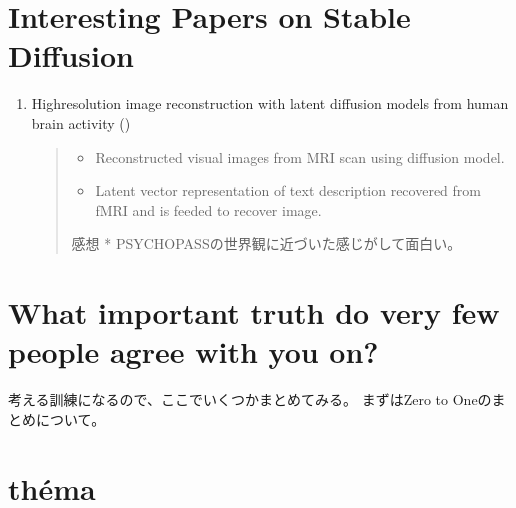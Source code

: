 \documentclass[letterpaper,10pt,english]{sphinxmanual}
\begin{document}
\sphinxstepscope


\section{Interesting Papers on Stable Diffusion}
\label{\detokenize{src/theme/stablediffusion_papers:interesting-papers-on-stable-diffusion}}\label{\detokenize{src/theme/stablediffusion_papers::doc}}\begin{enumerate}
%
\item {} 
\sphinxAtStartPar
High\sphinxhyphen{}resolution image reconstruction with latent diffusion models from human brain activity ()
\begin{quote}
\begin{itemize}
\item {} 
\sphinxAtStartPar
Reconstructed visual images from MRI scan using diffusion model.

\item {} 
\sphinxAtStartPar
Latent vector representation of text description recovered from fMRI and is feeded to recover image.

\end{itemize}

\sphinxAtStartPar
感想
* PSYCHO\sphinxhyphen{}PASSの世界観に近づいた感じがして面白い。
\end{quote}

\end{enumerate}

\sphinxstepscope


\section{What important truth do very few people agree with you on?}
\label{\detokenize{src/theme/zerotoone:what-important-truth-do-very-few-people-agree-with-you-on}}\label{\detokenize{src/theme/zerotoone::doc}}
\sphinxAtStartPar
考える訓練になるので、ここでいくつかまとめてみる。
まずはZero to Oneのまとめについて。



\sphinxstepscope


\section{théma}
\label{\detokenize{src/theme/index:thema}}\label{\detokenize{src/theme/index::doc}}
\end{document}

